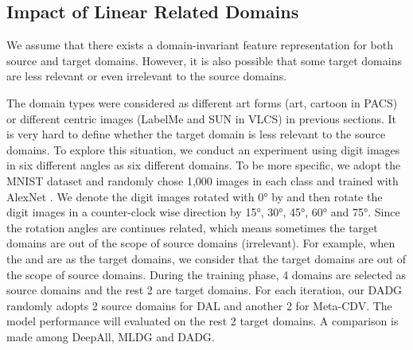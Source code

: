 \documentclass[twocolumn,preprint]{elsarticle}
\begin{document}
\begin{table}
  \renewcommand\arraystretch{1.1}
  \caption{Cross domain classification accuracy (in \%) on PACS dataset using AlexNet. The results of our implementation were the average over 20 repetitions. Each column name indicates the target domain. Best performance in bold.}
  \label{tab4}
\end{table}


\subsection{Impact of Linear Related Domains} \label{domain_relation_anay}
We assume that there exists a domain-invariant feature representation for both source and target domains. However, it is also possible that some target domains are less relevant or even irrelevant to the source domains. 

The domain types were considered as different art forms (art, cartoon in PACS) or different centric images (LabelMe and SUN in VLCS) in previous sections. It is very hard to define whether the target domain is less relevant to the source domains.
To explore this situation, we conduct an experiment using digit images in six different angles as six different domains. To be more specific, we adopt the MNIST \cite{lecun-mnisthandwrittendigit-2010} dataset and randomly chose 1,000 images in each class and trained with AlexNet \cite{alexnet}. We denote the digit images rotated with \ang{0} by  and then rotate the digit images in a counter-clock wise direction by \ang{15}, \ang{30}, \ang{45}, \ang{60} and \ang{75}. 
Since the rotation angles are continues related, which means sometimes the target domains are out of the scope of source domains (irrelevant). For example, when the  and  are as the target domains, we consider that the target domains are out of the scope of source domains. 
During the training phase, 4 domains are selected as source domains and the rest 2 are target domains. For each iteration, our DADG randomly adopts 2 source domains for DAL and another 2 for Meta-CDV. The model performance will evaluated on the rest 2 target domains. A comparison is made among DeepAll, MLDG \cite{mldg} and DADG. 
\end{document}
